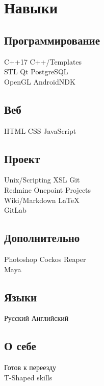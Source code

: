 \documentclass[a4paper]{curricula-vitae}
\begin{document}
\begin{minipage}[t]{0.33\textwidth}
\section{Навыки}

\subsection{Программирование}
C++17 \textbullet{} C++/Templates \\
STL \textbullet{} Qt \textbullet{} PostgreSQL \\
OpenGL \textbullet{} AndroidNDK


\insertspace

\subsection{Веб}
HTML \textbullet{} CSS \textbullet{} JavaScript

\insertspace

\subsection{Проект}
Unix/Scripting \textbullet{} XSL \textbullet{} Git \\
Redmine \textbullet{} Onepoint Projects \\
Wiki/Markdown \textbullet{} \LaTeX \\
GitLab

\insertspace

\subsection{Дополнительно}
Photoshop \textbullet{} Cockos Reaper \\
Maya

\insertspace

\subsection{Языки}
Русский \textbullet{} Английский

\insertspace

\subsection{О себе}
Готов к переезду \\
T-Shaped skills

\insertspace
\insertspace



\end{minipage}%
\end{document}
